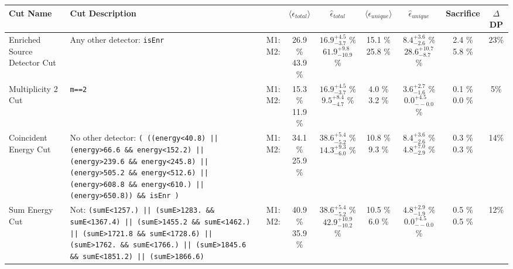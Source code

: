 \small
\begin{tabular}{|>{\raggedright}m{3cm}|m{6cm}|c c c|c c|c|c|}
\hline
  Cut Name & Cut Description &   & $\langle\epsilon_{total}\rangle$ & $\hat{\epsilon}_{total}$ & $\langle\epsilon_{unique}\rangle$ & $\hat{\epsilon}_{unique}$ & Sacrifice & $\Delta$DP \\
\hline
  Enriched Source Detector Cut & \tiny Any other detector: \texttt{isEnr} & \makecell{M1: \\ M2:} & \makecell{26.9 \% \\ 43.9 \%} & \makecell{$16.9^{+4.5}_{-3.7}$ \% \\ $61.9^{+9.8}_{-10.9}$ \%} & \makecell{15.1 \% \\ 25.8 \%} & \makecell{$8.4^{+3.6}_{-2.6}$ \% \\ $28.6^{+10.7}_{-8.7}$ \%} & \makecell{2.4 \% \\ 5.8 \%} & 23\% \\
  Multiplicity 2 Cut & \tiny  \texttt{m==2} & \makecell{M1: \\ M2:} & \makecell{15.3 \% \\ 11.9 \%} & \makecell{$16.9^{+4.5}_{-3.7}$ \% \\ $9.5^{+8.4}_{-4.7}$ \%} & \makecell{4.0 \% \\ 3.2 \%} & \makecell{$3.6^{+2.7}_{-1.6}$ \% \\ $0.0^{+4.5}_{--0.0}$ \%} & \makecell{0.1 \% \\ 0.0 \%} & 5\% \\
  Coincident Energy Cut & \tiny No other detector: \texttt{( ((energy<40.8) || (energy>66.6 \&\& energy<152.2) || (energy>239.6 \&\& energy<245.8) || (energy>505.2 \&\& energy<512.6) || (energy>608.8 \&\& energy<610.) || (energy>650.8)) \&\& isEnr )} & \makecell{M1: \\ M2:} & \makecell{34.1 \% \\ 25.9 \%} & \makecell{$38.6^{+5.4}_{-5.2}$ \% \\ $14.3^{+9.3}_{-6.0}$ \%} & \makecell{10.8 \% \\ 9.3 \%} & \makecell{$8.4^{+3.6}_{-2.6}$ \% \\ $4.8^{+7.0}_{-2.9}$ \%} & \makecell{0.3 \% \\ 0.3 \%} & 14\% \\
  Sum Energy Cut & \tiny Not:  \texttt{(sumE<1257.) || (sumE>1283. \&\& sumE<1367.4) || (sumE>1455.2 \&\& sumE<1462.) || (sumE>1721.8 \&\& sumE<1728.6) || (sumE>1762. \&\& sumE<1766.) || (sumE>1845.6 \&\& sumE<1851.2) || (sumE>1866.6)} & \makecell{M1: \\ M2:} & \makecell{40.9 \% \\ 35.9 \%} & \makecell{$38.6^{+5.4}_{-5.2}$ \% \\ $42.9^{+10.9}_{-10.2}$ \%} & \makecell{10.5 \% \\ 6.0 \%} & \makecell{$4.8^{+2.9}_{-1.9}$ \% \\ $0.0^{+4.5}_{--0.0}$ \%} & \makecell{0.5 \% \\ 0.5 \%} & 12\% \\

\end{tabular}
